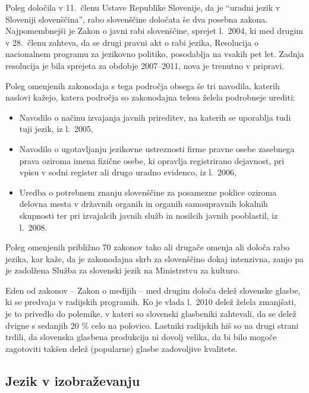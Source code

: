 \begin{multicols}{2}

Poleg določila v 11.~členu Ustave Republike Slovenije, da je “uradni jezik v Sloveniji slovenščina”, rabo slovenščine določata še dva posebna zakona. Naj\-pomembnejši je Zakon o javni rabi slovenščine, sprejet l.~2004, ki med drugim v 28.~členu zah\-teva, da se drugi pravni akt o rabi jezika, Resolucija o nacionalnem programu za jezikovno politiko, posodab\-lja na vsakih pet let. Zadnja resolucija je bila sprejeta za obdobje 2007--2011, nova je trenutno v pripravi. 

Poleg omenjenih zakonodaja s tega področja obsega še tri navodila, katerih naslovi kažejo, katera področja so zakonodajna telesa želela podrobneje urediti: 

\begin{itemize}
\item Navodilo o načinu izvajanja javnih prireditev, na katerih se uporab\-lja tudi tuji jezik, iz l.~2005,
\item Navodilo o ugotav\-ljanju jezikovne ustreznosti firme pravne osebe zasebnega prava oziroma imena fizične osebe, ki oprav\-lja registrirano dejavnost, pri vpisu v sodni register ali drugo uradno evidenco, iz l.~2006,
\item Uredba o potrebnem znanju slovenščine za posamezne poklice oziroma delovna mesta v državnih organih in organih samou\-pravnih lokalnih skupnosti ter pri izvajalcih javnih služb in nosilcih javnih pooblastil, iz l.~2008.
\end{itemize}

Poleg omenjenih približno 70 zakonov tako ali drugače omenja ali določa rabo jezika, kar kaže, da je zakonodajna skrb za slovenščino dokaj intenzivna, zanjo pa je zadolžena Služba za slovenski jezik na Ministrstvu za kulturo. 

Eden od zakonov – Zakon o medijih – med drugim določa delež slovenske glasbe, ki se predvaja v radijskih programih. Ko je vlada l.~2010 delež želela zmanjšati, je to privedlo do polemike, v kateri so slovenski glasbeniki zah\-tevali, da se delež dvigne s sedanjih 20 \% celo na polovico. Lastniki radijskih hiš so na drugi strani trdili, da slovenska glasbena produkcija ni dovolj velika, da bi bilo mogoče zagotoviti takšen delež (popularne) glasbe zadovoljive kvalitete.

\subsection{Jezik v izobraževanju}


\end{multicols}
